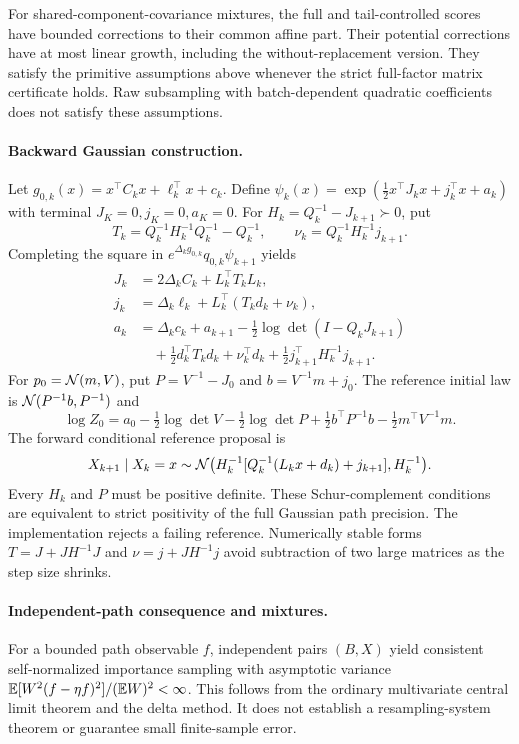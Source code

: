 For shared-component-covariance mixtures, the full and tail-controlled scores have bounded corrections to their common affine part. Their potential corrections have at most linear growth, including the without-replacement version. They satisfy the primitive assumptions above whenever the strict full-factor matrix certificate holds. Raw subsampling with batch-dependent quadratic coefficients does not satisfy these assumptions.

\paragraph{Backward Gaussian construction.}
Let $g_{0,k}(x)=x^\top C_kx+\ell_k^\top x+c_k$. Define
$\psi_k(x)=\exp(\tfrac12x^\top J_kx+j_k^\top x+a_k)$ with terminal $J_K=0,j_K=0,a_K=0$. For $H_k=Q_k^{-1}-J_{k+1}\succ0$, put
\[
 T_k=Q_k^{-1}H_k^{-1}Q_k^{-1}-Q_k^{-1},\qquad
 \nu_k=Q_k^{-1}H_k^{-1}j_{k+1}.
\]
Completing the square in $e^{\Delta_k g_{0,k}}q_{0,k}\psi_{k+1}$ yields
\begin{align*}
 J_k&=2\Delta_k C_k+L_k^\top T_kL_k,\\
 j_k&=\Delta_k\ell_k+L_k^\top(T_kd_k+\nu_k),\\
 a_k&=\Delta_kc_k+a_{k+1}-\tfrac12\log\det(I-Q_kJ_{k+1})\\
 &\quad+\tfrac12d_k^\top T_kd_k+\nu_k^\top d_k
 +\tfrac12j_{k+1}^\top H_k^{-1}j_{k+1}.
\end{align*}
For $p_0=\mathcal N(m,V)$, put $P=V^{-1}-J_0$ and $b=V^{-1}m+j_0$. The reference initial law is $\mathcal N(P^{-1}b,P^{-1})$ and
\[
 \log Z_0=a_0-\tfrac12\log\det V-\tfrac12\log\det P
 +\tfrac12 b^\top P^{-1}b-\tfrac12m^\top V^{-1}m.
\]
The forward conditional reference proposal is
\[
 X_{k+1}\mid X_k=x\sim
 \mathcal N\bigl(H_k^{-1}[Q_k^{-1}(L_kx+d_k)+j_{k+1}],H_k^{-1}\bigr).
\]
Every $H_k$ and $P$ must be positive definite. These Schur-complement conditions are equivalent to strict positivity of the full Gaussian path precision. The implementation rejects a failing reference. Numerically stable forms $T=J+JH^{-1}J$ and $\nu=j+JH^{-1}j$ avoid subtraction of two large matrices as the step size shrinks.

\paragraph{Independent-path consequence and mixtures.}
For a bounded path observable $f$, independent pairs $(B,X)$ yield consistent self-normalized importance sampling with asymptotic variance $\mathbb E[W^2(f-\eta f)^2]/(\mathbb E W)^2<\infty$. This follows from the ordinary multivariate central limit theorem and the delta method. It does not establish a resampling-system theorem or guarantee small finite-sample error.

